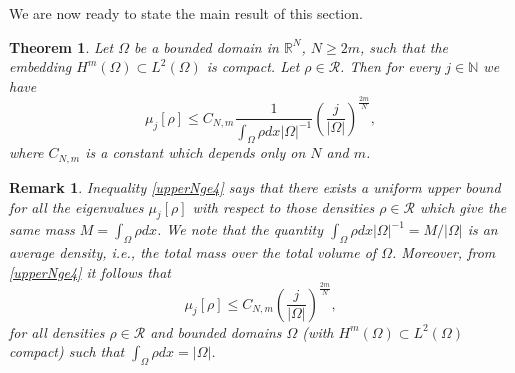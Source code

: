 \documentclass[11pt,a4paper]{amsart}
\numberwithin{equation}{section}
\newtheorem{thm}[equation]{Theorem}
\newtheorem{rem}[equation]{Remark}
\begin{document}
We are now ready to state the main result of this section.

\begin{thm}\label{thm_upperNge4}
Let $\Omega$ be a bounded domain in $\mathbb R^N$, $N\geq 2m$, such that the embedding $H^m(\Omega)\subset L^2(\Omega)$ is compact. Let $\rho\in\mathcal R$. Then for every $j\in\mathbb N$ we have
\begin{equation}\label{upperNge4}
\mu_j[\rho]\leq C_{N,m}\frac{1}{\int_{\Omega}\rho dx |\Omega|^{-1}}\left(\frac{j}{|\Omega|}\right)^{\frac{2m}{N}},
\end{equation}
where $C_{N,m}$ is a constant which depends only on $N$ and $m$.
\end{thm}

\begin{rem}
Inequality \eqref{upperNge4} says that there exists a uniform upper bound for all the eigenvalues $\mu_j[\rho]$ with respect to those densities $\rho\in\mathcal R$ which give the same mass $M=\int_{\Omega}\rho dx$. We note that the quantity $\int_{\Omega}\rho dx |\Omega|^{-1}=M/|\Omega|$ is an average density, i.e., the total mass over the total volume of $\Omega$. Moreover, from \eqref{upperNge4} it follows that
\begin{equation*}
\mu_j[\rho]\leq C_{N,m}\left(\frac{j}{|\Omega|}\right)^{\frac{2m}{N}},
\end{equation*}
for all densities $\rho\in\mathcal R$ and bounded domains $\Omega$ (with $H^m(\Omega)\subset L^2(\Omega)$ compact) such that $\int_{\Omega}\rho dx=|\Omega|$.
\end{rem}
\end{document}
